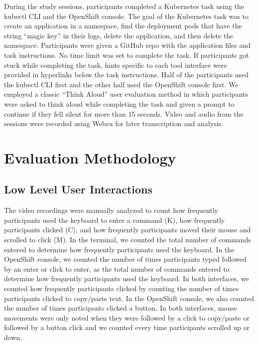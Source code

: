 \documentclass[11pt, oneside]{article}   	%
\begin{document}
During the study sessions, participants completed a Kubernetes task using the kubectl CLI and the OpenShift console. The goal of the Kubernetes task was to create an application in a namespace, find the deployment pods that have the string ``magic key'' in their logs, delete the application, and then delete the namespace. Participants were given a GitHub repo with the application files and task instructions. No time limit was set to complete the task. If participants got stuck while completing the task, hints specific to each tool interface were provided in hyperlinks below the task instructions. Half of the participants used the kubectl CLI first and the other half used the OpenShift console first. We employed a classic ``Think Aloud'' user evaluation method in which participants were asked to think aloud while completing the task and given a prompt to continue if they fell silent for more than 15 seconds. Video and audio from the sessions were recorded using Webex for later transcription and analysis. 


\section{Evaluation Methodology}
\subsection{Low Level User Interactions}
The video recordings were manually analyzed to count how frequently participants used the keyboard to enter a command (K), how frequently participants clicked (C), and how frequently participants moved their mouse and scrolled to click (M). In the terminal, we counted the total number of commands entered to determine how frequently participants used the keyboard. In the OpenShift console, we counted the number of times participants typed followed by an enter or click to enter, as the total number of commands entered to determine how frequently participants used the keyboard. In both interfaces, we counted how frequently participants clicked by counting the number of times participants clicked to copy/paste text. In the OpenShift console, we also counted the number of times participants clicked a button. In both interfaces, mouse movements were only noted when they were followed by a click to copy/paste or followed by a button click and we counted every time participants scrolled up or down. 
\end{document}
